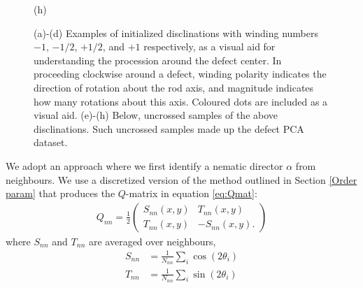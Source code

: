 \begin{figure}[!t]
\begin{minipage}[t]{0.25\textwidth}
		(h)
	\end{minipage}%
	\caption{(a)-(d) Examples of initialized disclinations with winding numbers $-1$, $-1/2$, $+1/2$, and $+1$ respectively, as a visual aid for understanding the procession around the defect center. In proceeding clockwise around a defect, winding polarity indicates the direction of rotation about the rod axis, and magnitude indicates how many rotations about this axis. Coloured dots are included as a visual aid. (e)-(h) Below, uncrossed samples of the above disclinations. Such uncrossed samples made up the defect PCA dataset.
	}
	\label{FIG:defects_pure}
\end{figure}

We adopt an approach where we first identify a nematic director $\alpha$ from neighbours. We use a discretized version of the method outlined in Section \ref{Order param} that produces the $Q$-matrix in equation \ref{eq:Qmat}:
\begin{align*}
	Q_{nn} = \frac{1}{2}\left(
	\begin{matrix}
	S_{nn}(x,y) & T_{nn}(x,y)\\
	T_{nn}(x,y) & -S_{nn}(x,y).
	\end{matrix}
	\right)
\end{align*}
where $S_{nn}$ and $T_{nn}$ are averaged over neighbours,
\begin{align*}
	S_{nn} &= \frac{1}{N_{nn}}\sum_i \cos(2\theta_i)\\
	T_{nn} &= \frac{1}{N_{nn}}\sum_i \sin(2\theta_i)
\end{align*} 






